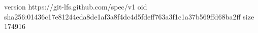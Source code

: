 version https://git-lfs.github.com/spec/v1
oid sha256:01436c17e81244eda8de1af3a8f4dc4d5fdeff763a3f1c1a37b569ffd68ba2ff
size 174916
